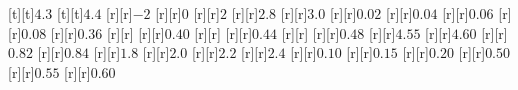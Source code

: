 \begin{psfrags}
[t][t]{$4.3$}%
[t][t]{$4.4$}%
%
[r][r]{$-2$}%
[r][r]{$0$}%
[r][r]{$2$}%
[r][r]{$2.8$}%
[r][r]{$3.0$}%
[r][r]{$0.02$}%
[r][r]{$0.04$}%
[r][r]{$0.06$}%
[r][r]{$0.08$}%
[r][r]{$0.36$}%
[r][r]{}%
[r][r]{$0.40$}%
[r][r]{}%
[r][r]{$0.44$}%
[r][r]{}%
[r][r]{$0.48$}%
[r][r]{$4.55$}%
[r][r]{$4.60$}%
[r][r]{$0.82$}%
[r][r]{$0.84$}%
[r][r]{$1.8$}%
[r][r]{$2.0$}%
[r][r]{$2.2$}%
[r][r]{$2.4$}%
[r][r]{$0.10$}%
[r][r]{$0.15$}%
[r][r]{$0.20$}%
[r][r]{$0.50$}%
[r][r]{$0.55$}%
[r][r]{$0.60$}%
%
%
\end{psfrags}%
%
